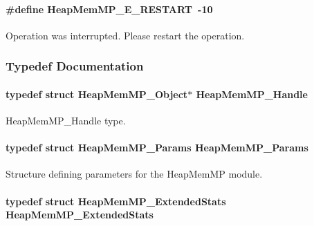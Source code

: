 \paragraph[{HeapMemMP\_\-E\_\-RESTART}]{\setlength{\rightskip}{0pt plus 5cm}\#define HeapMemMP\_\-E\_\-RESTART~-\/10}\hfill\label{_heap_mem_m_p_8h_a50fc296659efef22fea5863af26930d5}


Operation was interrupted. Please restart the operation. 



\subsubsection{Typedef Documentation}
\paragraph[{HeapMemMP\_\-Handle}]{\setlength{\rightskip}{0pt plus 5cm}typedef struct HeapMemMP\_\-Object$\ast$ {\bf HeapMemMP\_\-Handle}}\hfill\label{_heap_mem_m_p_8h_a9aa6360e22c2f5f387c5aba52a1a8522}


HeapMemMP\_\-Handle type. 

\paragraph[{HeapMemMP\_\-Params}]{\setlength{\rightskip}{0pt plus 5cm}typedef struct {\bf HeapMemMP\_\-Params}  {\bf HeapMemMP\_\-Params}}\hfill\label{_heap_mem_m_p_8h_a888191d73ac615e5335b1add34db69e8}


Structure defining parameters for the HeapMemMP module. 

\paragraph[{HeapMemMP\_\-ExtendedStats}]{\setlength{\rightskip}{0pt plus 5cm}typedef struct {\bf HeapMemMP\_\-ExtendedStats}  {\bf HeapMemMP\_\-ExtendedStats}}\hfill\label{_heap_mem_m_p_8h_a366cf280eda1086a46528b999b035618}


